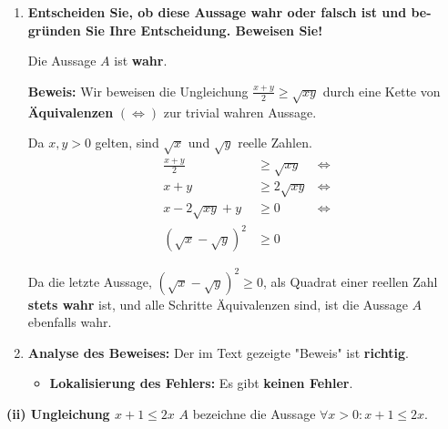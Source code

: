 \documentclass{article}
\begin{document}
\begin{enumerate}[label=(\alph*)]
    \item \textbf{Entscheiden Sie, ob diese Aussage wahr oder falsch ist und be-
              gründen Sie Ihre Entscheidung. Beweisen Sie!}

          Die Aussage $A$ ist \textbf{wahr}.

          \textbf{Beweis:}
          Wir beweisen die Ungleichung $\frac{x+y}{2} \geq \sqrt{xy}$ durch eine Kette von \textbf{Äquivalenzen} $(\iff)$ zur trivial wahren Aussage.

          Da $x, y > 0$ gelten, sind $\sqrt{x}$ und $\sqrt{y}$ reelle Zahlen.
          \begin{align*}
              \frac{x+y}{2}           & \geq \sqrt{xy}  & \iff \\
              x + y                   & \geq 2\sqrt{xy} & \iff \\
              x - 2\sqrt{xy} + y      & \geq 0          & \iff \\
              (\sqrt{x} - \sqrt{y})^2 & \geq 0
          \end{align*}

          Da die letzte Aussage, $(\sqrt{x} - \sqrt{y})^2 \geq 0$, als Quadrat einer reellen Zahl \textbf{stets wahr} ist, und alle Schritte Äquivalenzen sind, ist die Aussage $A$ ebenfalls wahr.

    \item \textbf{Analyse des Beweises:}
          Der im Text gezeigte "Beweis" ist \textbf{richtig}.
          \begin{itemize}
              \item \textbf{Lokalisierung des Fehlers:} Es gibt \textbf{keinen Fehler}.
          \end{itemize}
\end{enumerate}

\bigskip

\textbf{(ii) Ungleichung $x+1 \leq 2x$}
$A$ bezeichne die Aussage $\forall x > 0: x+1 \leq 2x$.
\end{document}
